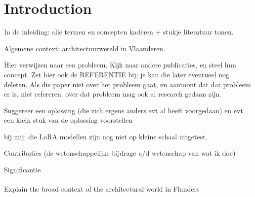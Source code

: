 \chapter{Introduction}
In de inleiding: alle termen en concepten kaderen + stukje literatuur tonen.

Algemene context: architectuurwereld in Vlaanderen.

Hier verwijzen naar een probleem. Kijk naar andere publicaties, en steel hun concept. Zet hier ook de REFERENTIE bij; je kan die later eventueel nog deleten.
Als die paper niet over het probleem gaat, en aantoont dat dat probleem er is, niet refereren.
over dat probleem mag ook al research gedaan zijn.

Suggereer een oplossing (die zich ergens anders evt al heeft voorgedaan) 
en evt een klein stuk van de oplossing voorstellen

bij mij: die LoRA modellen zijn nog niet op kleine schaal uitgetest.

Contributies (de wetenschappelijke bijdrage a/d wetenschap van wat ik doe)

Significantie \\
\\
Explain the broad context of the architectural world in Flanders
\\
\\
